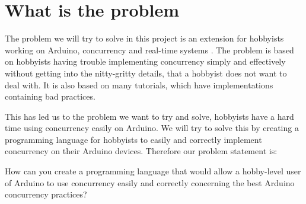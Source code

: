 \section{What is the problem}\label{sec:whatistheproblem}
The problem we will try to  solve in this project is an extension for hobbyists working on Arduino, concurrency and real-time systems . The problem is based on hobbyists having trouble implementing concurrency simply and effectively without getting into the nitty-gritty details, that a hobbyist does not want to deal with. It is also based on many tutorials, which have implementations containing bad practices.%

This has led us to the problem we want to try and solve, hobbyists have a hard time using concurrency easily on Arduino. We will try to solve this by creating a programming language for hobbyists to easily and correctly implement concurrency on their Arduino devices. Therefore our problem statement is:

How can you create a programming language that would allow a hobby-level user of Arduino to use concurrency easily and correctly concerning the best Arduino concurrency practices?
